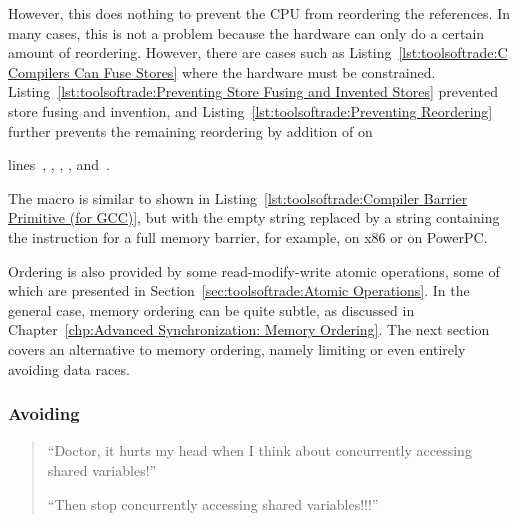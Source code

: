 However, this does nothing to prevent the CPU from reordering the
references.
In many cases, this is not a problem because the hardware can only do
a certain amount of reordering.
However, there are cases such as
Listing~\ref{lst:toolsoftrade:C Compilers Can Fuse Stores} where the
hardware must be constrained.
Listing~\ref{lst:toolsoftrade:Preventing Store Fusing and Invented Stores}
prevented store fusing and invention, and
Listing~\ref{lst:toolsoftrade:Preventing Reordering}
further prevents the remaining reordering by addition of
 on
\begin{fcvref}
lines~, , , ,
and~.
\end{fcvref}
The  macro is similar to  shown in
Listing~\ref{lst:toolsoftrade:Compiler Barrier Primitive (for GCC)},
but with the empty string replaced by a string containing the
instruction for a full memory barrier, for example, 
on x86 or  on PowerPC.

\QuickQuizEnd

Ordering is also provided by some read-modify-write atomic
operations, some of which are presented in
Section~\ref{sec:toolsoftrade:Atomic Operations}.
In the general case, memory ordering can be quite subtle, as
discussed in
Chapter~\ref{chp:Advanced Synchronization: Memory Ordering}.
The next section covers an alternative to memory ordering, namely
limiting or even entirely avoiding data races.

\subsubsection{Avoiding }
\label{sec:toolsoftrade:Avoiding Data Races}

\begin{quote}
``Doctor, it hurts my head when I think about concurrently accessing
shared variables!''

``Then stop concurrently accessing shared variables!!!''
\end{quote}


